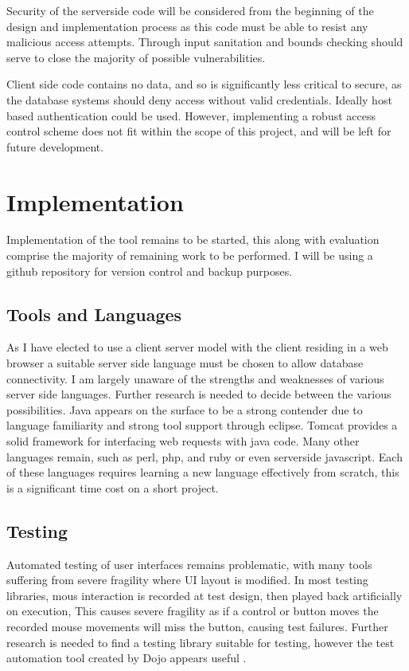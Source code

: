Security of the serverside code will be considered from the beginning of the design and implementation process
as this code must be able to resist any malicious access attempts. Through input sanitation and bounds checking should serve to close the majority of possible vulnerabilities.

Client side code contains no data, and so is significantly less critical to secure, as the database systems should deny access without valid credentials. Ideally host based authentication could be used. However, implementing a robust access control scheme does not fit within the scope of this project, and will be left for future development.

\section{Implementation}

Implementation of the tool remains to be started, this along with evaluation comprise the majority of remaining work to be performed.
I will be using a github repository for version control and backup purposes.

\subsection{Tools and Languages}\label{tools}

As I have elected to use a client server model with the client residing in a web browser a suitable server side language must be chosen to allow database connectivity. I am largely unaware of the strengths and weaknesses of various server side languages. Further research is needed to decide between the various possibilities. Java appears on the surface to be a strong contender due to language familiarity and strong tool support through eclipse. Tomcat provides a solid framework for interfacing web requests with java code.
Many other languages remain, such as perl, php, and ruby or even serverside javascript. Each of these languages requires learning a new language effectively from scratch, this is a significant time cost on a short project. 

\subsection{Testing}
Automated testing of user interfaces remains problematic, with many tools suffering from severe fragility where UI layout is modified. In most testing libraries, mous interaction is recorded at test design, then played back artificially on execution, This causes severe fragility as if a control or button moves the recorded mouse movements will miss the button, causing test failures. Further research is needed to find a testing library suitable for testing, however the test automation tool created by Dojo appears useful \cite{dojo2013test}.


